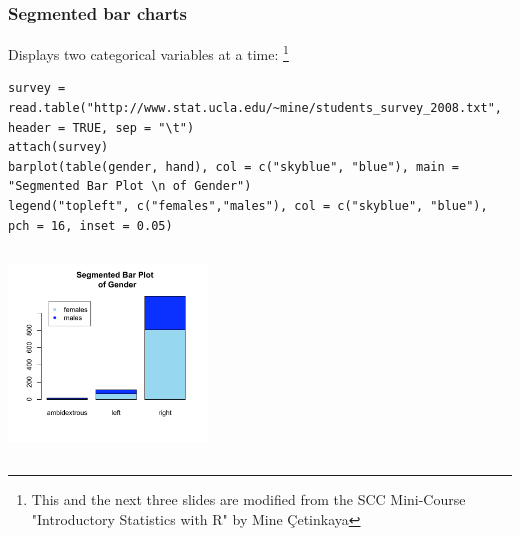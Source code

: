 \begin{frame}
  \frametitle{Segmented bar charts}

Displays two categorical variables at a time: \footnote{This and the next three slides are modified from the SCC Mini-Course "Introductory Statistics with R" by Mine \c{C}etinkaya}

\tiny
\begin{lstlisting}
survey = read.table("http://www.stat.ucla.edu/~mine/students_survey_2008.txt", header = TRUE, sep = "\t")
attach(survey)
barplot(table(gender, hand), col = c("skyblue", "blue"), main = "Segmented Bar Plot \n of Gender")
legend("topleft", c("females","males"), col = c("skyblue", "blue"), pch = 16, inset = 0.05)
\end{lstlisting}

\newpage
    \begin{columns}
      
       \begin{center}
\includegraphics[width = 53mm]{images/segbarplot.pdf}
\end{center}

\begin{center}
\end{center}
\normalsize
\end{columns}

\end{frame}

